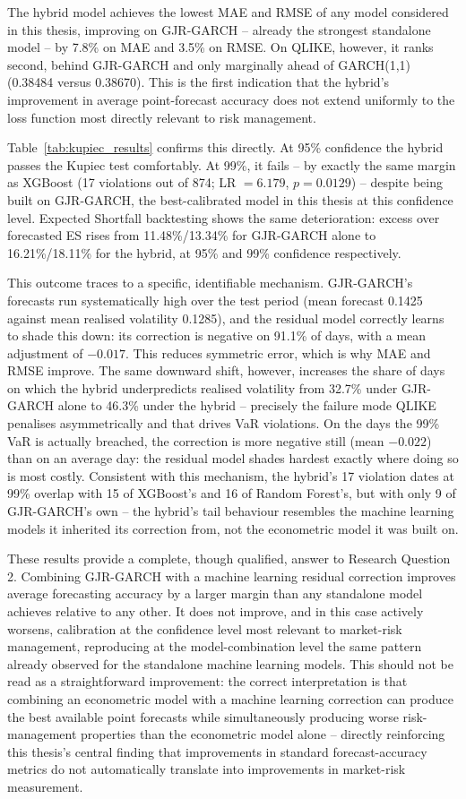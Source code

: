 \documentclass[12pt,a4paper]{article}
\begin{document}
The hybrid model achieves the lowest MAE and RMSE of any model considered in this thesis, improving
on GJR-GARCH -- already the strongest standalone model -- by 7.8\% on MAE and 3.5\% on RMSE. On
QLIKE, however, it ranks second, behind GJR-GARCH and only marginally ahead of GARCH(1,1) (0.38484
versus 0.38670). This is the first indication that the hybrid's improvement in average point-forecast
accuracy does not extend uniformly to the loss function most directly relevant to risk management.

Table~\ref{tab:kupiec_results} confirms this directly. At 95\% confidence the hybrid passes the
Kupiec test comfortably. At 99\%, it fails -- by exactly the same margin as XGBoost (17 violations
out of 874; LR $=6.179$, $p=0.0129$) -- despite being built on GJR-GARCH, the best-calibrated model
in this thesis at this confidence level. Expected Shortfall backtesting shows the same
deterioration: excess over forecasted ES rises from 11.48\%/13.34\% for GJR-GARCH alone to
16.21\%/18.11\% for the hybrid, at 95\% and 99\% confidence respectively.

This outcome traces to a specific, identifiable mechanism. GJR-GARCH's forecasts run systematically
high over the test period (mean forecast 0.1425 against mean realised volatility 0.1285), and
the residual model correctly learns to shade this down: its correction is negative on 91.1\% of
days, with a mean adjustment of $-0.017$. This reduces symmetric error, which is why MAE and RMSE
improve. The same downward shift, however, increases the share of days on which the hybrid
underpredicts realised volatility from 32.7\% under GJR-GARCH alone to 46.3\% under the hybrid --
precisely the failure mode QLIKE penalises asymmetrically and that drives VaR violations. On the
days the 99\% VaR is actually breached, the correction is more negative still (mean $-0.022$) than
on an average day: the residual model shades hardest exactly where doing so is most costly.
Consistent with this mechanism, the hybrid's 17 violation dates at 99\% overlap with 15 of
XGBoost's and 16 of Random Forest's, but with only 9 of GJR-GARCH's own -- the hybrid's tail
behaviour resembles the machine learning models it inherited its correction from, not the
econometric model it was built on.

These results provide a complete, though qualified, answer to Research Question 2. Combining
GJR-GARCH with a machine learning residual correction improves average forecasting accuracy by a
larger margin than any standalone model achieves relative to any other. It does not improve, and in
this case actively worsens, calibration at the confidence level most relevant to market-risk
management, reproducing at the model-combination level the same pattern already observed for the
standalone machine learning models. This should not be read as a straightforward improvement: the
correct interpretation is that combining an econometric model with a machine learning correction can
produce the best available point forecasts while simultaneously producing worse risk-management
properties than the econometric model alone -- directly reinforcing this thesis's central finding
that improvements in standard forecast-accuracy metrics do not automatically translate into
improvements in market-risk measurement.
\end{document}
